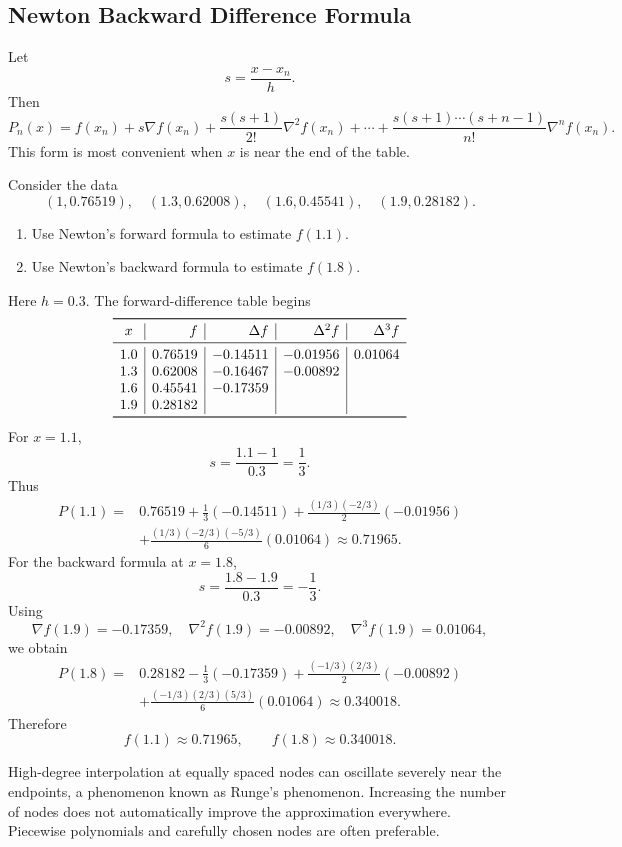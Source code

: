 \subsection{Newton Backward Difference Formula}

Let
\[
 s=\frac{x-x_n}{h}.
\]
Then
\[
 P_n(x)=f(x_n)
 +s\nabla f(x_n)
 +\frac{s(s+1)}{2!}\nabla^2f(x_n)
 +\cdots
 +\frac{s(s+1)\cdots(s+n-1)}{n!}\nabla^nf(x_n).
\]
This form is most convenient when $x$ is near the end of the table.

\begin{example}
Consider the data
\[
 (1,0.76519),\quad
 (1.3,0.62008),\quad
 (1.6,0.45541),\quad
 (1.9,0.28182).
\]
\begin{enumerate}[label=(\alph*),leftmargin=2.7em]
  \item Use Newton's forward formula to estimate $f(1.1)$.
  \item Use Newton's backward formula to estimate $f(1.8)$.
\end{enumerate}
\end{example}

\begin{solution}[10.0cm]
Here $h=0.3$.  The forward-difference table begins
\[
\begin{array}{c|r|r|r|r}
\toprule
x&f&\Delta f&\Delta^2f&\Delta^3f\\
\midrule
1.0&0.76519&-0.14511&-0.01956&0.01064\\
1.3&0.62008&-0.16467&-0.00892&\\
1.6&0.45541&-0.17359&&\\
1.9&0.28182&&&\\
\bottomrule
\end{array}
\]
For $x=1.1$,
\[
 s=\frac{1.1-1}{0.3}=\frac13.
\]
Thus
\[
\begin{aligned}
P(1.1)={}&0.76519
+\frac13(-0.14511)
+\frac{(1/3)(-2/3)}{2}(-0.01956)\\
&+\frac{(1/3)(-2/3)(-5/3)}{6}(0.01064)
\approx0.71965.
\end{aligned}
\]
For the backward formula at $x=1.8$,
\[
 s=\frac{1.8-1.9}{0.3}=-\frac13.
\]
Using
\[
 \nabla f(1.9)=-0.17359,
 \quad
 \nabla^2f(1.9)=-0.00892,
 \quad
 \nabla^3f(1.9)=0.01064,
\]
we obtain
\[
\begin{aligned}
P(1.8)={}&0.28182
-\frac13(-0.17359)
+\frac{(-1/3)(2/3)}2(-0.00892)\\
&+\frac{(-1/3)(2/3)(5/3)}6(0.01064)
\approx0.340018.
\end{aligned}
\]
Therefore
\[
 f(1.1)\approx0.71965,
 \qquad
 f(1.8)\approx0.340018.
\]
\end{solution}

\begin{remark}
High-degree interpolation at equally spaced nodes can oscillate severely near the endpoints, a phenomenon known as Runge's phenomenon.  Increasing the number of nodes does not automatically improve the approximation everywhere.  Piecewise polynomials and carefully chosen nodes are often preferable.
\end{remark}
